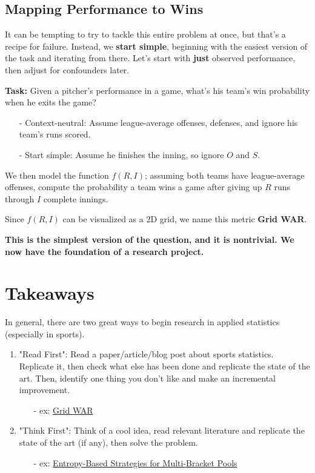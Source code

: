 \documentclass[twoside]{article}
\theoremstyle{definition}
\begin{document}
\subsection{Mapping Performance to Wins}
It can be tempting to try to tackle this entire problem at once, but that's a recipe for failure. Instead, we \textbf{start simple}, beginning with the easiest version of the task and iterating from there. Let's start with \textbf{just} observed performance, then adjust for confounders later.

\textbf{Task:} Given a pitcher's performance in a game, what's his team's win probability when he exits the game?
\begin{itemize}
    \item[-] Context-neutral: Assume league-average offenses, defenses, and ignore his team's runs scored.
    \item[-] Start simple: Assume he finishes the inning, so ignore $O$ and $S$.
\end{itemize}
We then model the function $f(R, I)$; assuming both teams have league-average offenses, compute the probability a team wins a game after giving up $R$ runs through $I$ complete innings.

Since $f(R, I)$ can be visualized as a 2D grid, we name this metric \textbf{Grid WAR}.

\color{red}
\textbf{This is the simplest version of the question, and it is nontrivial. We now have the foundation of a research project.}
\color{black}
\section{Takeaways}

In general, there are two great ways to begin research in applied statistics (especially in sports).
\begin{enumerate}
    \item "Read First": Read a paper/article/blog post about sports statistics. Replicate it, then check what else has been done and replicate the state of the art. Then, identify one thing you don't like and make an incremental improvement.
    \begin{itemize}
        \item[-] ex: \href{https://www.degruyterbrill.com/document/doi/10.1515/jqas-2023-0095/html}{Grid WAR}
    \end{itemize}
    \item "Think First": Think of a cool idea, read relevant literature and replicate the state of the art (if any), then solve the problem.
    \begin{itemize}
        \item[-] ex: \href{https://www.mdpi.com/1099-4300/26/8/615}{Entropy-Based Strategies for Multi-Bracket Pools}
    \end{itemize}
\end{enumerate}
\end{document}
